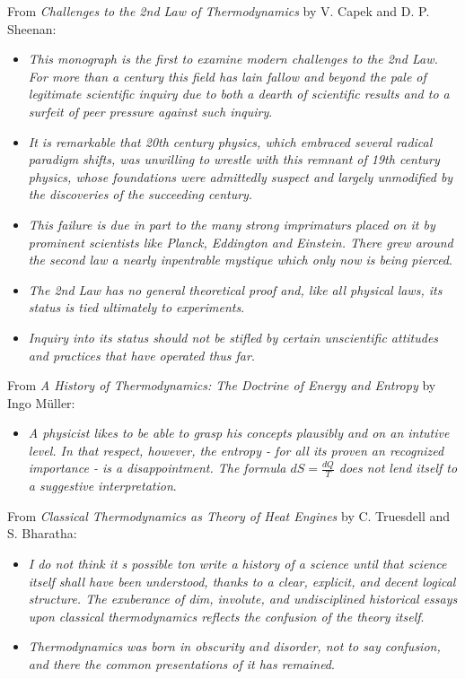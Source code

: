 \noindent
From \emph{Challenges to the 2nd Law of Thermodynamics} by V. Capek and D. P. Sheenan:

\noindent
\begin{itemize} 
\item \emph{This monograph is the first to examine modern challenges to the 2nd Law. For more than a century
this field has lain fallow and beyond the pale of legitimate scientific inquiry due to both a dearth of scientific results and to a surfeit of peer pressure against such inquiry}.
\item \emph{It is remarkable that 20th century physics, which embraced several radical paradigm shifts, was unwilling to wrestle with this remnant of 19th century physics, whose foundations were admittedly suspect and largely unmodified by the discoveries of the succeeding century}.
\item \emph{This failure is due in part to the many strong imprimaturs placed on it by prominent scientists like Planck, Eddington and Einstein. There grew around the second law a nearly inpentrable mystique which only now is being pierced}.
\item \emph{The 2nd Law has no general theoretical proof and, like all physical laws, its status is tied ultimately to experiments}.
\item \emph{Inquiry into its status should not be stifled by certain unscientific attitudes and practices that have operated thus far}.
\end{itemize} 

\noindent
From \emph{A History of Thermodynamics: The Doctrine of Energy and Entropy} by Ingo M\"uller:
\begin{itemize}
\item \emph{A physicist likes to be able to grasp his concepts plausibly and on an intutive level. In that respect, however, the entropy - for all its proven an recognized importance - is a disappointment. The formula $dS=\frac{dQ}{T}$ does not lend itself to a suggestive interpretation}.
\end{itemize}

\noindent
From \emph{Classical Thermodynamics as Theory of Heat Engines} by C. Truesdell and S. Bharatha:
\begin{itemize}
\item \emph{I do not think it s possible ton write a history of a science until that science itself shall have been understood, thanks to a clear, explicit, and decent logical structure. The exuberance of dim, involute, and undisciplined historical essays upon classical thermodynamics reflects the confusion of the theory itself}.
\item \emph{Thermodynamics was born in obscurity and disorder, not to say confusion, and there the common presentations of it has remained}.
\end{itemize}

